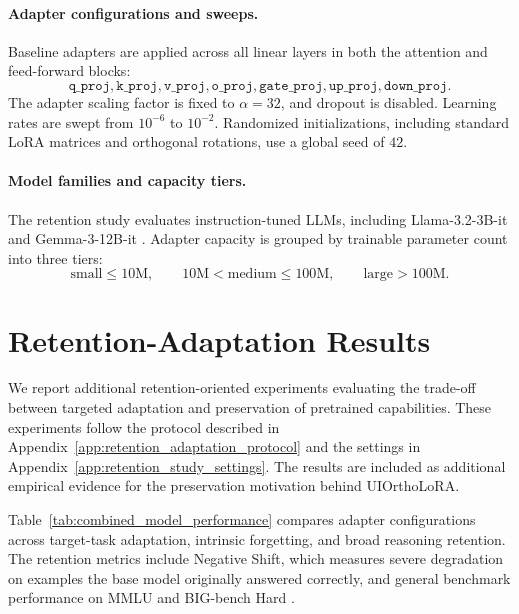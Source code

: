 \documentclass{article}
\begin{document}
\paragraph{Adapter configurations and sweeps.}
Baseline adapters are applied across all linear layers in both the attention
and feed-forward blocks:
\[
\texttt{q\_proj},
\texttt{k\_proj},
\texttt{v\_proj},
\texttt{o\_proj},
\texttt{gate\_proj},
\texttt{up\_proj},
\texttt{down\_proj}.
\]
The adapter scaling factor is fixed to \(\alpha = 32\), and dropout is
disabled. Learning rates are swept from \(10^{-6}\) to \(10^{-2}\). Randomized
initializations, including standard LoRA matrices and orthogonal rotations,
use a global seed of \(42\).

\paragraph{Model families and capacity tiers.}
The retention study evaluates instruction-tuned LLMs, including
Llama-3.2-3B-it \citep{llama3_2024} and Gemma-3-12B-it \citep{gemma3_2025}. Adapter capacity is grouped by trainable
parameter count into three tiers:
\[
\text{small} \leq 10\text{M},
\qquad
10\text{M} < \text{medium} \leq 100\text{M},
\qquad
\text{large} > 100\text{M}.
\]

\section{Retention-Adaptation Results}
\label{app:retention_adaptation_results}

We report additional retention-oriented experiments evaluating the trade-off
between targeted adaptation and preservation of pretrained capabilities. These
experiments follow the protocol described in
Appendix~\ref{app:retention_adaptation_protocol} and the settings in
Appendix~\ref{app:retention_study_settings}. The results are included as
additional empirical evidence for the preservation motivation behind
UIOrthoLoRA.

Table~\ref{tab:combined_model_performance} compares adapter configurations across
target-task adaptation, intrinsic forgetting, and broad reasoning retention.
The retention metrics include Negative Shift, which measures severe degradation
on examples the base model originally answered correctly, and general benchmark
performance on MMLU \citep{hendrycks2020measuring} and BIG-bench Hard \citep{srivastava2023beyond}.


\end{document}
